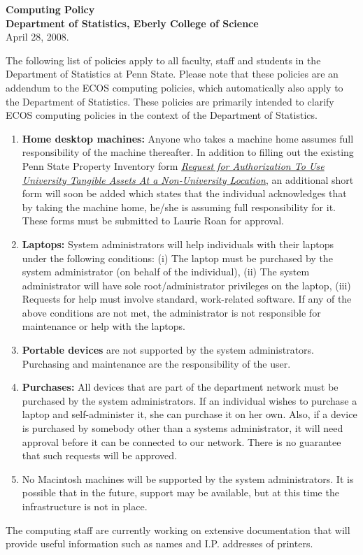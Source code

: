 \documentclass[12pt]{article}
\date{April 28, 2008}
\begin{document}
\begin{center}
\Huge  {\bf Computing Policy}\\
\Large  {\bf Department of Statistics, Eberly College of Science}\\
\large April 28, 2008.
\end{center}

The following list of policies apply to all faculty, staff and
students in the Department of Statistics at Penn State. Please note
that these policies are an addendum to the ECOS computing policies,
which automatically also apply to the Department of Statistics. These
policies are primarily intended to clarify ECOS computing policies in
the context of the Department of Statistics.
\begin{enumerate}
\item {\bf Home desktop machines:} Anyone who takes a machine home
  assumes full responsibility of the machine thereafter. In addition
  to filling out the existing Penn State Property Inventory form
  \href{http://www.guru.psu.edu/forms/6-03RequestForAuthorizationToUseUniversityTangibleAssetsataNon-UniversityLocationFRM3.PDF}{{\it
      Request for Authorization To Use University Tangible Assets At a
      Non-University Location}}, an additional short form will soon be
  added which states that the individual acknowledges that by taking
  the machine home, he/she is assuming full responsibility for it.
  These forms must be submitted to Laurie Roan for approval.
\item {\bf Laptops:} System administrators will help individuals with their
  laptops under the following conditions: (i) The laptop must be
  purchased by the system administrator (on behalf of the individual),
  (ii) The system administrator will have sole root/administrator
  privileges on the laptop, (iii) Requests for help must involve
  standard, work-related software. If any of the above conditions are
  not met, the administrator is not responsible for maintenance or
  help with the laptops.
\item {\bf Portable devices} are not supported by the system administrators.
  Purchasing and maintenance are the responsibility of the user.
\item {\bf Purchases:} All devices that are part of the department
  network must be purchased by the system administrators. If an
  individual wishes to purchase a laptop and self-administer it, she
  can purchase it on her own.  Also, if a device is purchased by
  somebody other than a systems administrator, it will need approval
  before it can be connected to our network. There is no guarantee
  that such requests will be approved.
\item No Macintosh machines will be supported by the system
  administrators.  It is possible that in the future, support may be
  available, but at this time the infrastructure is not in place.
\end{enumerate} 

 The computing staff are currently
working on extensive documentation that will provide useful
information such as names and I.P. addresses of printers.
\end{document}

